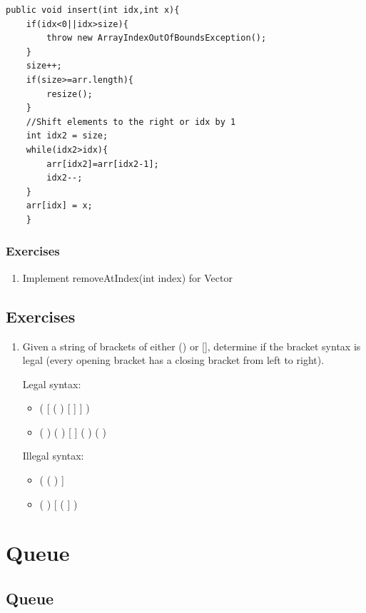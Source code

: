 \documentclass[11pt,oneside]{book}
\begin{document}
\begin{lstlisting}
public void insert(int idx,int x){
    if(idx<0||idx>size){
        throw new ArrayIndexOutOfBoundsException();
    }
    size++;
    if(size>=arr.length){
        resize();
    }
    //Shift elements to the right or idx by 1
    int idx2 = size;
    while(idx2>idx){
        arr[idx2]=arr[idx2-1];
        idx2--;
    }   
    arr[idx] = x;
    }
\end{lstlisting}

\subsection{Exercises}

\begin{enumerate}
\item Implement removeAtIndex(int index) for Vector
\end{enumerate}

        \section{ Exercises }
        

\begin{enumerate}
\item Given a string of brackets of either () or [], determine if the bracket syntax is legal (every opening bracket has a closing bracket from left to right).

Legal syntax:

\begin{itemize}
\item ( [ ( ) [ ] ] )
\item ( ) ( ) [ ] ( ) ( )
\end{itemize}

Illegal syntax:

\begin{itemize}
\item ( ( ) ]
\item ( ) [ ( ] )
\end{itemize}
\end{enumerate}

    \chapter{ Queue }
        \section{ Queue }
        
\end{document}
